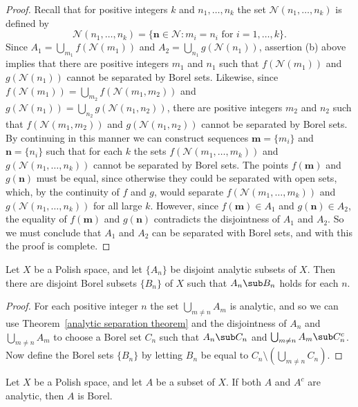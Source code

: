 \begin{proof}
Recall that for positive integers $k$ and $n_1,\dots,n_k$ the set $\mathscr{N}(n_1,\dots,n_k)$ is defined by
\[\mathscr{N}(n_1,\dots,n_k)=\{\mathbf{n}\in\mathscr{N}:m_i=n_i\text{ for }i=1,\dots,k\}.\]
Since $A_1=\bigcup_{m_1}f(\mathscr{N}(m_1))$ and $A_2=\bigcup_{n_1}g(\mathscr{N}(n_1))$, assertion (b) above implies that there are positive integers $m_1$ and $n_1$ such that $f(\mathscr{N}(m_1))$ and $g(\mathscr{N}(n_1))$ cannot be separated by Borel sets. Likewise, since $f(\mathscr{N}(m_1))=\bigcup_{m_2}f(\mathscr{N}(m_1,m_2))$ and $g(\mathscr{N}(n_1))=\bigcup_{n_2}g(\mathscr{N}(n_1,n_2))$, there are positive integers $m_2$ and $n_2$ such that $f(\mathscr{N}(m_1,m_2))$ and $g(\mathscr{N}(n_1,n_2))$ cannot be separated by Borel sets. By continuing in this manner we can construct sequences $\mathbf{m}=\{m_i\}$ and $\mathbf{n}=\{n_i\}$ such that for each $k$ the sets $f(\mathscr{N}(m_1,\dots,m_k))$ and $g(\mathscr{N}(n_1,\dots,n_k))$ cannot be separated by Borel sets. The points $f(\mathbf{m})$ and $g(\mathbf{n})$ must be equal, since otherwise they could be separated with open sets, which, by the continuity of $f$ and $g$, would separate $f(\mathscr{N}(m_1,\dots,m_k))$ and $g(\mathscr{N}(n_1,\dots,n_k))$ for all large $k$. However, since $f(\mathbf{m})\in A_1$ and $g(\mathbf{n})\in A_2$, the equality of $f(\mathbf{m})$ and $g(\mathbf{n})$ contradicts the disjointness of $A_1$ and $A_2$. So we must conclude that $A_1$ and $A_2$ can be separated with Borel sets, and with this the proof is complete.
\end{proof}
\begin{corollary}\label{Polish disjoint analytic sequence separate}
Let $X$ be a Polish space, and let $\{A_n\}$ be disjoint analytic subsets of $X$. Then there are disjoint Borel subsets $\{B_n\}$ of $X$ such that $A_n\sub B_n$ holds for each $n$.
\end{corollary}
\begin{proof}
For each positive integer $n$ the set $\bigcup_{m\neq n}A_m$ is analytic, and so we can use Theorem~\ref{analytic separation theorem} and the disjointness of $A_n$ and $\bigcup_{m\neq n}A_m$ to choose a Borel set $C_n$ such that $A_n\sub C_n$ and $\bigcup_{m\neq n}A_m\sub C_n^c$. Now define the Borel sets $\{B_n\}$ by letting $B_n$ be equal to $C_n\setminus(\bigcup_{m\neq n}C_n)$.
\end{proof}
\begin{corollary}\label{Polish analytic complement iff Borel}
Let $X$ be a Polish space, and let $A$ be a subset of $X$. If both $A$ and $A^c$ are analytic, then $A$ is Borel.
\end{corollary}
